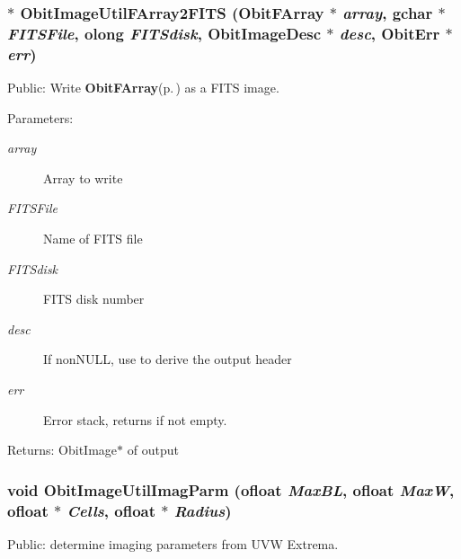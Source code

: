 \subsubsection{$\ast$ Obit\-Image\-Util\-FArray2FITS ({\bf Obit\-FArray} $\ast$ {\em array}, gchar $\ast$ {\em FITSFile}, {\bf olong} {\em FITSdisk}, {\bf Obit\-Image\-Desc} $\ast$ {\em desc}, {\bf Obit\-Err} $\ast$ {\em err})}\label{ObitImageUtil_8h_a21}


Public: Write {\bf Obit\-FArray}{\rm (p.\,\pageref{structObitFArray})} as a FITS image. 

\begin{Desc}
\item[Parameters:]
\begin{description}
\item[{\em array}]Array to write \item[{\em FITSFile}]Name of FITS file \item[{\em FITSdisk}]FITS disk number \item[{\em desc}]If non\-NULL, use to derive the output header \item[{\em err}]Error stack, returns if not empty. \end{description}
\end{Desc}
\begin{Desc}
\item[Returns:]Obit\-Image$\ast$ of output \end{Desc}
\subsubsection{\setlength{\rightskip}{0pt plus 5cm}void Obit\-Image\-Util\-Imag\-Parm ({\bf ofloat} {\em Max\-BL}, {\bf ofloat} {\em Max\-W}, {\bf ofloat} $\ast$ {\em Cells}, {\bf ofloat} $\ast$ {\em Radius})}\label{ObitImageUtil_8h_a12}


Public: determine imaging parameters from UVW Extrema. 

